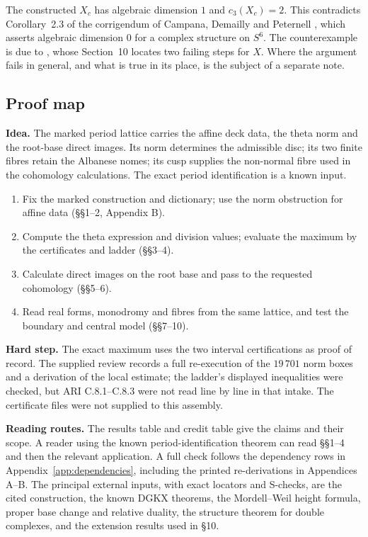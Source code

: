 \documentclass[11pt,a4paper]{article}
\theoremstyle{plain}
\theoremstyle{definition}
\begin{document}
The constructed $X_c$ has algebraic dimension $1$ and $c_3(X_c)=2$. This contradicts Corollary~2.3 of the corrigendum of Campana, Demailly and Peternell \cite[Corollary 2.3]{CDP20}, which asserts algebraic dimension $0$ for a complex structure on $S^6$. The counterexample is due to \cite[Main Theorem; Section 10]{AC26}, whose Section~10 locates two failing steps for $X$. Where the argument fails in general, and what is true in its place, is the subject of a separate note.

\subsection*{Proof map}
\textbf{Idea.} The marked period lattice carries the affine deck data, the theta norm and the root-base direct images. Its norm determines the admissible disc; its two finite fibres retain the Albanese nomes; its cusp supplies the non-normal fibre used in the cohomology calculations. The exact period identification is a known input.
\begin{enumerate}[leftmargin=*,label=\arabic*.]
\item Fix the marked construction and dictionary; use the norm obstruction for affine data (\S\S1--2, Appendix B).
\item Compute the theta expression and division values; evaluate the maximum by the certificates and ladder (\S\S3--4).
\item Calculate direct images on the root base and pass to the requested cohomology (\S\S5--6).
\item Read real forms, monodromy and fibres from the same lattice, and test the boundary and central model (\S\S7--10).
\end{enumerate}
\textbf{Hard step.} The exact maximum uses the two interval certifications as proof of record. The supplied review records a full re-execution of the $19\,701$ norm boxes and a derivation of the local estimate; the ladder's displayed inequalities were checked, but ARI C.8.1--C.8.3 were not read line by line in that intake. The certificate files were not supplied to this assembly.

\textbf{Reading routes.} The results table and credit table give the claims and their scope. A reader using the known period-identification theorem can read \S\S1--4 and then the relevant application. A full check follows the dependency rows in Appendix~\ref{app:dependencies}, including the printed re-derivations in Appendices A--B. The principal external inputs, with exact locators and S-checks, are the cited construction, the known DGKX theorems, the Mordell--Weil height formula, proper base change and relative duality, the structure theorem for double complexes, and the extension results used in \S10.
\clearpage
\end{document}
